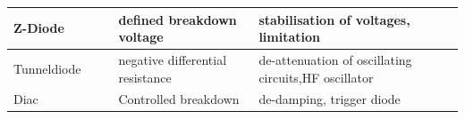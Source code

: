 {\begin{table}[H]
\begin{tabular}{ |p{2.2cm}|p{1.4cm}|p{3.3cm}|p{2.8cm}|p{3.3cm}| }
        \hline
        Z-Diode
        &
        \begin{minipage}[t][2.4cm][c]{1.4cm}
            \centering 
        \end{minipage}
        & 
        \begin{minipage}[t][2.4cm][c]{3.3cm}
            \centering 
        \end{minipage}
        & 
        defined breakdown voltage &
        stabilisation \newline of voltages, \newline limitation\\
        \hline
        Tunnel\-diode
        &
        \begin{minipage}[t][2.4cm][c]{1.4cm}
            \centering 
        \end{minipage}
        & 
        \begin{minipage}[t][2.4cm][c]{3.3cm}
            \centering 
        \end{minipage}
        & 
        negative differential resistance &
        de-attenuation \newline of oscillating circuits,\newline HF oscillator\\
        \hline
        Diac
        &
        \begin{minipage}[t][2.4cm][c]{1.4cm}
            \centering 
        \end{minipage}
        & 
        \begin{minipage}[t][2.4cm][c]{3.3cm}
            \centering 
        \end{minipage}
        & 
        Controlled breakdown & 
        de-damping, \newline trigger diode\\
        \hline
    \end{tabular}
\end{table}
}

